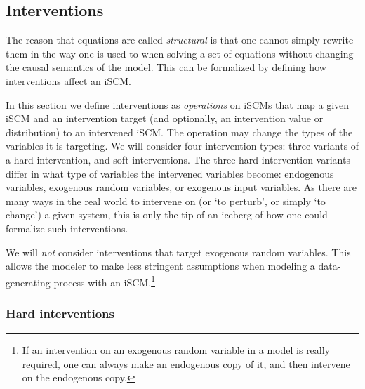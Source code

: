 \subsection{Interventions}

The reason that equations  are called \emph{structural} is that one cannot simply rewrite them in the way one is used to when solving a set of equations without changing the causal semantics of the model.
This can be formalized by defining how interventions affect an iSCM.

In this section we define interventions as \emph{operations} on iSCMs that map a given iSCM and an intervention target (and optionally, an intervention value or distribution) to an intervened iSCM. 
The operation may change the types of the variables it is targeting.
We will consider four intervention types: three variants of a hard intervention, and soft interventions. 
The three hard intervention variants differ in what type of variables the intervened variables become: endogenous variables, exogenous random variables, or exogenous input variables.
As there are many ways in the real world to intervene on (or `to perturb', or simply `to change') a given system, this is only the tip of an iceberg of how one could formalize such interventions.

\begin{Rem}
We will \emph{not} consider interventions that target exogenous random variables.
This allows the modeler to make less stringent assumptions when modeling a data-generating process with an iSCM.\footnote{If an intervention on an exogenous random variable in a model is really required, one can always make an endogenous copy of it, and then intervene on the endogenous copy.}
\end{Rem}

\subsubsection{Hard interventions}

